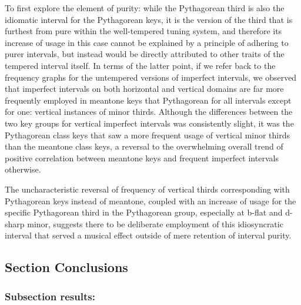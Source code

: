 To first explore the element of purity: while the Pythagorean third is
also the idiomatic interval for the Pythagorean keys, it is the version
of the third that is furthest from pure within the well-tempered tuning
system, and therefore its increase of usage in this case cannot be
explained by a principle of adhering to purer intervals, but instead
would be directly attributed to other traits of the tempered interval
itself. In terms of the latter point, if we refer back to the frequency
graphs for the untempered versions of imperfect intervals, we observed
that imperfect intervals on both horizontal and vertical domains are far
more frequently employed in meantone keys that Pythagorean for all
intervals except for one: vertical instances of minor thirds. Although
the differences between the two key groups for vertical imperfect
intervals was consistently slight, it was the Pythagorean class keys
that saw a more frequent usage of vertical minor thirds than the
meantone class keys, a reversal to the overwhelming overall trend of
positive correlation between meantone keys and frequent imperfect
intervals otherwise.

The uncharacteristic reversal of frequency of vertical thirds
corresponding with Pythagorean keys instead of meantone, coupled with an
increase of usage for the specific Pythagorean third in the Pythagorean
group, especially at b-flat and d-sharp minor, suggests there to be
deliberate employment of this idiosyncratic interval that served a
musical effect outside of mere retention of interval purity.

    \subsection{Section Conclusions}\label{section-conclusions}

\subsubsection{Subsection results:}\label{subsection-results}

